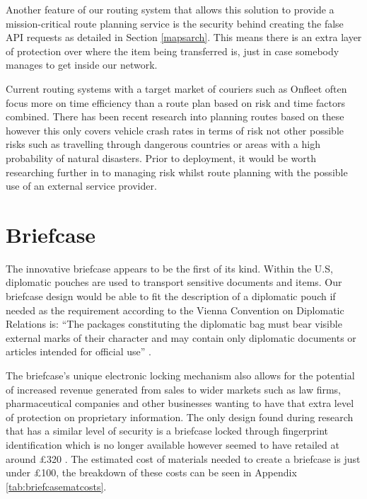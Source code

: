 Another feature of our routing system that allows this solution to provide a mission-critical route planning service is the security behind creating the false API requests as detailed in Section \ref{mapsarch}. This means there is an extra layer of protection over where the item being transferred is, just in case somebody manages to get inside our network. 

Current routing systems with a target market of couriers such as Onfleet \cite{onfleet} often focus more on time efficiency than a route plan based on risk and time factors combined. There has been recent research into planning routes based on these \cite{krumm2017risk} however this only covers vehicle crash rates in terms of risk not other possible risks such as travelling through dangerous countries or areas with a high probability of natural disasters. Prior to deployment, it would be worth researching further in to managing risk whilst route planning with the possible use of an external service provider.

\section{Briefcase} \label{briefcasemarket}

The innovative briefcase appears to be the first of its kind. Within the U.S, diplomatic pouches are used to transport sensitive documents and items. Our briefcase design would be able to fit the description of a diplomatic pouch if needed as the requirement according to the Vienna Convention on Diplomatic Relations is: “The packages constituting the diplomatic bag must bear visible external marks of their character and may contain only diplomatic documents or articles intended for official use” \cite{viennaConvention}. 

The briefcase’s unique electronic locking mechanism also allows for the potential of increased revenue generated from sales to wider markets such as law firms, pharmaceutical companies and other businesses wanting to have that extra level of protection on proprietary information. The only design found during research that has a similar level of security is a briefcase locked through fingerprint identification which is no longer available however seemed to have retailed at around £320 \cite{fingerprintBriefcase} \cite{biometricBriefcase}. The estimated cost of materials needed to create a briefcase is just under £100, the breakdown of these costs can be seen in Appendix \ref{tab:briefcasematcosts}. 

